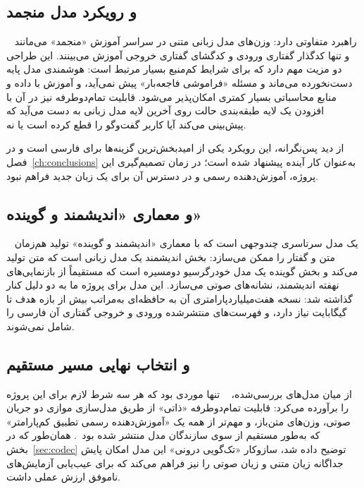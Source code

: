 \subsection{ و رویکرد مدل منجمد}

~\cite{wang2025freezeomni} راهبرد متفاوتی دارد: وزن‌های مدل
زبانی متنی در سراسر آموزش «منجمد» می‌مانند و تنها کدگذار گفتاری ورودی و
کدگشای گفتاری خروجی آموزش می‌بینند. این طراحی دو مزیت مهم دارد که برای
شرایط کم‌منبع بسیار مرتبط است: هوشمندی مدل پایه دست‌نخورده می‌ماند و مسئله
«فراموشی فاجعه‌بار» پیش نمی‌آید، و آموزش با داده و منابع محاسباتی
بسیار کمتری امکان‌پذیر می‌شود. قابلیت تمام‌دوطرفه نیز در آن با افزودن یک
لایه طبقه‌بندی حالت روی آخرین لایه مدل زبانی به دست می‌آید که پیش‌بینی
می‌کند آیا کاربر گفت‌وگو را قطع کرده است یا نه.

از دید پس‌نگرانه، این رویکرد یکی از امیدبخش‌ترین گزینه‌ها برای فارسی است و
در فصل~\ref{ch:conclusions} به‌عنوان کار آینده پیشنهاد شده است؛ در زمان
تصمیم‌گیری این پروژه، آموزش‌دهنده رسمی و در دسترس آن برای یک زبان جدید
فراهم نبود.

\subsection{ و معماری «اندیشمند و گوینده»}

~\cite{xu2025qwen25omni} یک مدل سرتاسری چند‌وجهی است که با
معماری «اندیشمند و گوینده» تولید هم‌زمان متن و گفتار را ممکن می‌سازد:
بخش اندیشمند یک مدل زبانی است که متن تولید می‌کند و بخش گوینده یک مدل
خودرگرسیو دو‌مسیره است که مستقیماً از بازنمایی‌های نهفته اندیشمند، نشانه‌های
صوتی می‌سازد. این مدل برای پروژه ما به دو دلیل کنار گذاشته شد: نسخه هفت‌میلیارد‌پارامتری
آن به حافظه‌ای به‌مراتب بیش از بازه هدف  تا  گیگابایت نیاز
دارد، و فهرست‌های منتشرشده ورودی و خروجی گفتاری آن فارسی را شامل
نمی‌شوند.

\subsection{ و انتخاب نهایی مسیر مستقیم}

از میان مدل‌های بررسی‌شده، ~\cite{defossez2024moshi} تنها موردی بود
که هر سه شرط لازم برای این پروژه را برآورده می‌کرد: قابلیت تمام‌دوطرفه
«ذاتی» از طریق مدل‌سازی موازی دو جریان صوتی، وزن‌های متن‌باز، و
مهم‌تر از همه یک «آموزش‌دهنده رسمی تطبیق کم‌پارامتر» که به‌طور مستقیم
از سوی سازندگان مدل منتشر شده بود~\cite{moshifinetune2024}. همان‌طور که در
بخش~\ref{sec:codec} توضیح داده شد، سازوکار «تک‌گویی درونی» این مدل امکان
پایش جداگانه زیان متنی و زیان صوتی را نیز فراهم می‌کند که برای عیب‌یابی
آزمایش‌های ناموفق ارزش عملی داشت.

